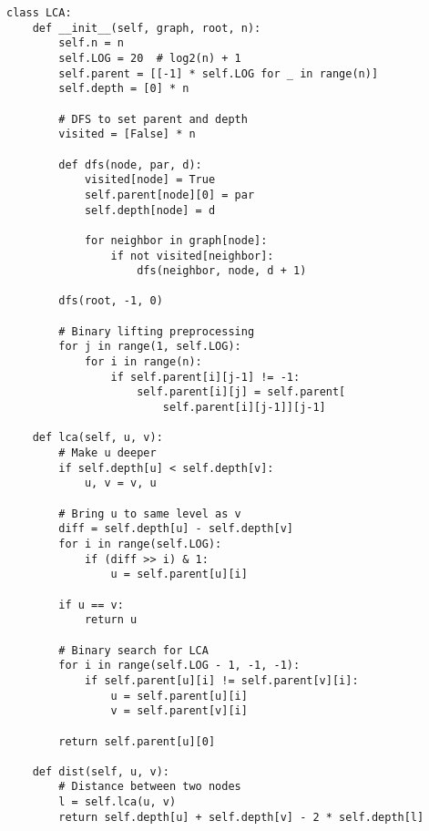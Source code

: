 \begin{lstlisting}
class LCA:
    def __init__(self, graph, root, n):
        self.n = n
        self.LOG = 20  # log2(n) + 1
        self.parent = [[-1] * self.LOG for _ in range(n)]
        self.depth = [0] * n
        
        # DFS to set parent and depth
        visited = [False] * n
        
        def dfs(node, par, d):
            visited[node] = True
            self.parent[node][0] = par
            self.depth[node] = d
            
            for neighbor in graph[node]:
                if not visited[neighbor]:
                    dfs(neighbor, node, d + 1)
        
        dfs(root, -1, 0)
        
        # Binary lifting preprocessing
        for j in range(1, self.LOG):
            for i in range(n):
                if self.parent[i][j-1] != -1:
                    self.parent[i][j] = self.parent[
                        self.parent[i][j-1]][j-1]
    
    def lca(self, u, v):
        # Make u deeper
        if self.depth[u] < self.depth[v]:
            u, v = v, u
        
        # Bring u to same level as v
        diff = self.depth[u] - self.depth[v]
        for i in range(self.LOG):
            if (diff >> i) & 1:
                u = self.parent[u][i]
        
        if u == v:
            return u
        
        # Binary search for LCA
        for i in range(self.LOG - 1, -1, -1):
            if self.parent[u][i] != self.parent[v][i]:
                u = self.parent[u][i]
                v = self.parent[v][i]
        
        return self.parent[u][0]
    
    def dist(self, u, v):
        # Distance between two nodes
        l = self.lca(u, v)
        return self.depth[u] + self.depth[v] - 2 * self.depth[l]
\end{lstlisting}
